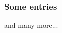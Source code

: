 \documentclass{beamer}
\begin{document}
  \begin{frame}
    \frametitle{Some entries}
    \begin{bibunit}
      \nocite{Yang2007, Goldlucke2014, Li2014}
      \putbib
    \end{bibunit}
    and many more...
  \end{frame}
\end{document}
